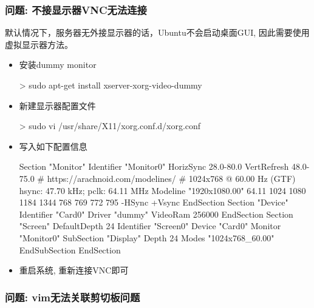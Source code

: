 \subsubsection{问题: 不接显示器VNC无法连接}
默认情况下，服务器无外接显示器的话，Ubuntu不会启动桌面GUI, 因此需要使用虚拟显示器方法。
\begin{itemize}
\item 安装dummy monitor
\begin{commandbox}
 > sudo apt-get install xserver-xorg-video-dummy
\end{commandbox}

\item 新建显示器配置文件
\begin{commandbox}
 > sudo vi /usr/share/X11/xorg.conf.d/xorg.conf
\end{commandbox}

\item 写入如下配置信息
\begin{messagebox}
Section "Monitor"
  Identifier "Monitor0"
  HorizSync 28.0-80.0
  VertRefresh 48.0-75.0
  # https://arachnoid.com/modelines/
  # 1024x768 @ 60.00 Hz (GTF) hsync: 47.70 kHz; pclk: 64.11 MHz
  Modeline "1920x1080.00" 64.11 1024 1080 1184 1344 768 769 772 795 -HSync +Vsync
EndSection
Section "Device"
  Identifier "Card0"
  Driver "dummy"
  VideoRam 256000
EndSection
Section "Screen"
  DefaultDepth 24
  Identifier "Screen0"
  Device "Card0"
  Monitor "Monitor0"
  SubSection "Display"
    Depth 24
    Modes "1024x768_60.00"
  EndSubSection
EndSection
\end{messagebox}

\item 重启系统, 重新连接VNC即可

\end{itemize}

\subsubsection{问题: vim无法关联剪切板问题}

